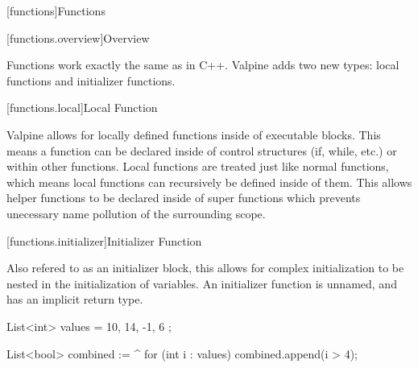 [functions]{Functions}

%
%
%
%
%
%
%
%
%
%
%
%
%
%
%
%
%
%
%
%
%
%

[functions.overview]{Overview}

Functions work exactly the same as in C++. Valpine adds two new types: local functions and initializer functions.

[functions.local]{Local Function}

Valpine allows for locally defined functions inside of executable blocks. This means a function can be declared inside of control structures (if, while, etc.) or within other functions. Local functions are treated just like normal functions, which means local functions can recursively be defined inside of them. This allows helper functions to be declared inside of super functions which prevents unecessary name pollution of the surrounding scope.


[functions.initializer]{Initializer Function}

Also refered to as an initializer block, this allows for complex initialization to be nested in the initialization of variables. An initializer function is unnamed, and has an implicit return type.

\begin{codeblock}

List<int> values = { 10, 14, -1, 6 };

List<bool> combined := ^{
	for (int i : values)
	{
		combined.append(i > 4);
	}
}

\end{codeblock}
